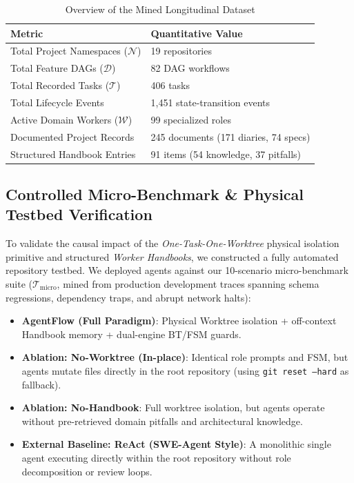 \documentclass[conference]{IEEEtran}
\begin{document}
\begin{table}[h]
\centering
\caption{Overview of the Mined Longitudinal Dataset}
\label{tab:dataset_overview}
\begin{tabularx}{\columnwidth}{lX}
\toprule
\textbf{Metric} & \textbf{Quantitative Value} \\
\midrule
Total Project Namespaces ($\mathcal{N}$) & 19 repositories \\
Total Feature DAGs ($\mathcal{D}$) & 82 DAG workflows \\
Total Recorded Tasks ($\mathcal{T}$) & 406 tasks \\
Total Lifecycle Events & 1,451 state-transition events \\
Active Domain Workers ($\mathcal{W}$) & 99 specialized roles \\
Documented Project Records & 245 documents (171 diaries, 74 specs) \\
Structured Handbook Entries & 91 items (54 knowledge, 37 pitfalls) \\
\bottomrule
\end{tabularx}
\end{table}

\subsection{Controlled Micro-Benchmark \& Physical Testbed Verification}
\label{sec:ablation}
To validate the causal impact of the \textit{One-Task-One-Worktree} physical isolation primitive and structured \textit{Worker Handbooks}, we constructed a fully automated repository testbed. We deployed agents against our 10-scenario micro-benchmark suite ($\mathcal{T}_{\text{micro}}$, mined from production development traces spanning schema regressions, dependency traps, and abrupt network halts):
\begin{itemize}
    \item \textbf{AgentFlow (Full Paradigm)}: Physical Worktree isolation + off-context Handbook memory + dual-engine BT/FSM guards.
    \item \textbf{Ablation: No-Worktree (In-place)}: Identical role prompts and FSM, but agents mutate files directly in the root repository (using \texttt{git reset --hard} as fallback).
    \item \textbf{Ablation: No-Handbook}: Full worktree isolation, but agents operate without pre-retrieved domain pitfalls and architectural knowledge.
    \item \textbf{External Baseline: ReAct (SWE-Agent Style)}: A monolithic single agent executing directly within the root repository without role decomposition or review loops.
\end{itemize}
\end{document}
